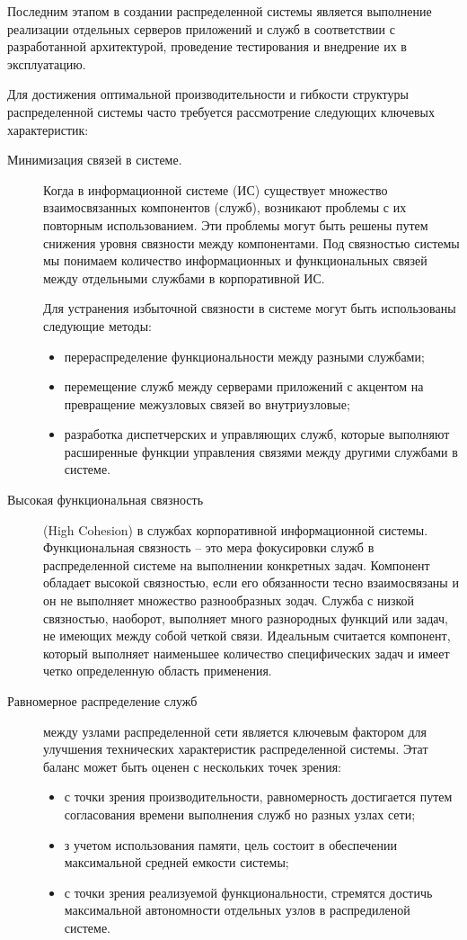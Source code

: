 \documentclass[report, draught]{fefudoc}
\begin{document}
Последним этапом в создании распределенной системы является выполнение реализации отдельных серверов приложений и служб в соответствии с разработанной архитектурой, проведение тестирования и внедрение их в эксплуатацию.

Для достижения оптимальной производительности и гибкости структуры распределенной системы часто требуется рассмотрение следующих ключевых характеристик:
\begin{description}
\item[Минимизация связей в системе.] Когда в информационной системе (ИС) существует множество взаимосвязанных компонентов (служб), возникают проблемы с их повторным использованием. Эти проблемы могут быть решены путем снижения уровня связности между компонентами. Под связностью системы мы понимаем количество информационных и функциональных связей между отдельными службами в корпоративной ИС.

Для устранения избыточной связности в системе могут быть использованы следующие методы:

\begin{itemize}
\item перераспределение функциональности между разными службами;
\item перемещение служб между серверами приложений с акцентом на превращение межузловых связей во внутриузловые;
\item разработка диспетчерских и управляющих служб, которые выполняют расширенные функции управления связями между другими службами в системе.
\end{itemize}

\item[Высокая функциональная связность] (High Cohesion) в службах корпоративной информационной системы. Функциональная связность – это мера фокусировки служб в распределенной системе на выполнении конкретных задач. Компонент обладает высокой связностью, если его обязанности тесно взаимосвязаны и он не выполняет множество разнообразных зодач. Служба с низкой связностью, наоборот, выполняет много разнородных функций или задач, не имеющих между собой четкой связи. Идеальным считается компонент, который выполняет наименьшее количество специфических задач и имеет четко определенную область применения.
\item[Равномерное распределение служб] между узлами распределенной сети является ключевым фактором для улучшения технических характеристик распределенной системы. Этат баланс может быть оценен с нескольких точек зрения:
\begin{itemize}
\item с точки зрения производительности, равномерность достигается путем согласования времени выполнения служб но разных узлах сети;
\item з учетом использования памяти, цель состоит в обеспечении максимальной средней емкости системы;
\item с точки зрения реализуемой функциональности, стремятся достичь максимальной автономности отдельных узлов в распредиленой системе.
\end{itemize}
\end{description}
\end{document}
